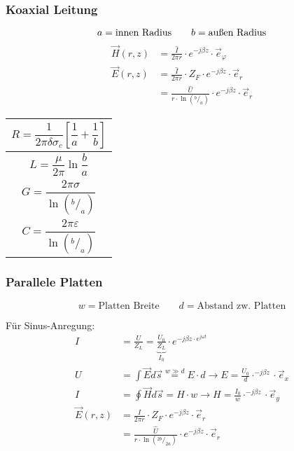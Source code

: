 \subsubsection{Koaxial Leitung}
{\small\[
        a = \text{innen Radius} \qquad b = \text{außen Radius} \\
    \]}
\begin{align*}
    \vec{H}(r, z) & = \frac{\hat{I}}{2\pi r}\cdot e^{-j\beta z}\cdot\vec{e}_\varphi                    \\
    \vec{E}(r, z) & = \frac{\hat{I}}{2\pi r}\cdot Z_F\cdot e^{-j\beta z} \cdot\vec{e}_r                \\
                  & = \frac{\hat{U}}{r \cdot\ln{(^{b}/_{a})}}\cdot e^{-j\beta z}\cdot\vec{e}_r
\end{align*}

{\renewcommand*{\arraystretch}{0.2}
    \begin{tabularx}{0.5\columnwidth}{|X|}
        \hline
        \[R=\frac{1}{2\pi\delta\sigma_c}\left[\frac{1}{a}+\frac{1}{b}\right]\] \\
        \hline
        \[L=\frac{\mu}{2\pi}\ln\frac{b}{a}\]                                   \\
        \hline
        \[G=\frac{2\pi\sigma}{\ln(^b/_a)}\]                                    \\
        \hline
        \[C=\frac{2\pi\varepsilon}{\ln(^b/_a)}\]                               \\
        \hline
    \end{tabularx}}

\subsubsection{Parallele Platten}
{\small\[
        w  = \text{Platten Breite} \qquad d  = \text{Abstand zw. Platten}
    \]}

Für Sinus-Anregung:
\begin{align*}
    I             & = \frac{U}{Z_L} = \underbrace{\frac{U_0}{Z_L}}_{I_0}\cdot e^{-j\beta z\cdot e^{j\omega t}}                         \\
    U             & = \int \vec{E} d\vec{s} \stackrel{w\gg d}{=} E\cdot d \rightarrow E = \frac{U_0}{d}\cdot^{-j\beta z}\cdot\vec{e}_x \\
    I             & = \oint \vec{H} d\vec{s} =  H\cdot w \rightarrow H = \frac{I_0}{w}\cdot^{-j\beta z}\cdot\vec{e}_y                  \\
    \vec{E}(r, z) & = \frac{I}{2\pi r}\cdot Z_F\cdot e^{-j\beta z} \cdot\vec{e}_r                                                      \\
                  & = \frac{\hat{U}}{r \cdot\ln{(^{2b}/_{2a})}}\cdot e^{-j\beta z}\cdot\vec{e}_r
\end{align*}


